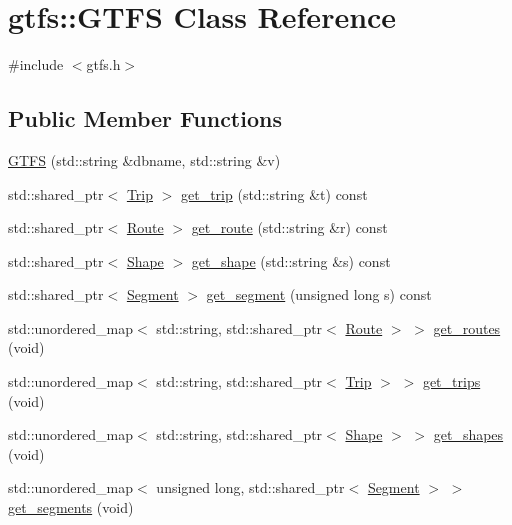 \hypertarget{classgtfs_1_1GTFS}{}\section{gtfs\+:\+:G\+T\+FS Class Reference}
\label{classgtfs_1_1GTFS}


{\ttfamily \#include $<$gtfs.\+h$>$}

\subsection*{Public Member Functions}
\begin{DoxyCompactItemize}
\item 
\hyperlink{classgtfs_1_1GTFS_abe065541610fe5d9673bc4befd0bcf94}{G\+T\+FS} (std\+::string \&dbname, std\+::string \&v)
\item 
std\+::shared\+\_\+ptr$<$ \hyperlink{classgtfs_1_1Trip}{Trip} $>$ \hyperlink{classgtfs_1_1GTFS_aec86fae3dee1e13f541798266fb2317e}{get\+\_\+trip} (std\+::string \&t) const
\item 
std\+::shared\+\_\+ptr$<$ \hyperlink{classgtfs_1_1Route}{Route} $>$ \hyperlink{classgtfs_1_1GTFS_a47cfbb8ca6cb8986e95f1038dcc7c04b}{get\+\_\+route} (std\+::string \&r) const
\item 
std\+::shared\+\_\+ptr$<$ \hyperlink{classgtfs_1_1Shape}{Shape} $>$ \hyperlink{classgtfs_1_1GTFS_a59d1a7209999120b2446298f9fac4564}{get\+\_\+shape} (std\+::string \&s) const
\item 
std\+::shared\+\_\+ptr$<$ \hyperlink{classgtfs_1_1Segment}{Segment} $>$ \hyperlink{classgtfs_1_1GTFS_afb9b3152a524f393c4414611dbeeba48}{get\+\_\+segment} (unsigned long s) const
\item 
std\+::unordered\+\_\+map$<$ std\+::string, std\+::shared\+\_\+ptr$<$ \hyperlink{classgtfs_1_1Route}{Route} $>$ $>$ \hyperlink{classgtfs_1_1GTFS_aef6a88c15cdf8bf788e41c81a14ecc76}{get\+\_\+routes} (void)
\item 
std\+::unordered\+\_\+map$<$ std\+::string, std\+::shared\+\_\+ptr$<$ \hyperlink{classgtfs_1_1Trip}{Trip} $>$ $>$ \hyperlink{classgtfs_1_1GTFS_ad526fc627fe1ce81b8a669f6187be0c0}{get\+\_\+trips} (void)
\item 
std\+::unordered\+\_\+map$<$ std\+::string, std\+::shared\+\_\+ptr$<$ \hyperlink{classgtfs_1_1Shape}{Shape} $>$ $>$ \hyperlink{classgtfs_1_1GTFS_a91ada6a3f02e3ee9b6a723a6c6fc50af}{get\+\_\+shapes} (void)
\item 
std\+::unordered\+\_\+map$<$ unsigned long, std\+::shared\+\_\+ptr$<$ \hyperlink{classgtfs_1_1Segment}{Segment} $>$ $>$ \hyperlink{classgtfs_1_1GTFS_ae124db38217498c5e1090447ccf11953}{get\+\_\+segments} (void)
\end{DoxyCompactItemize}


